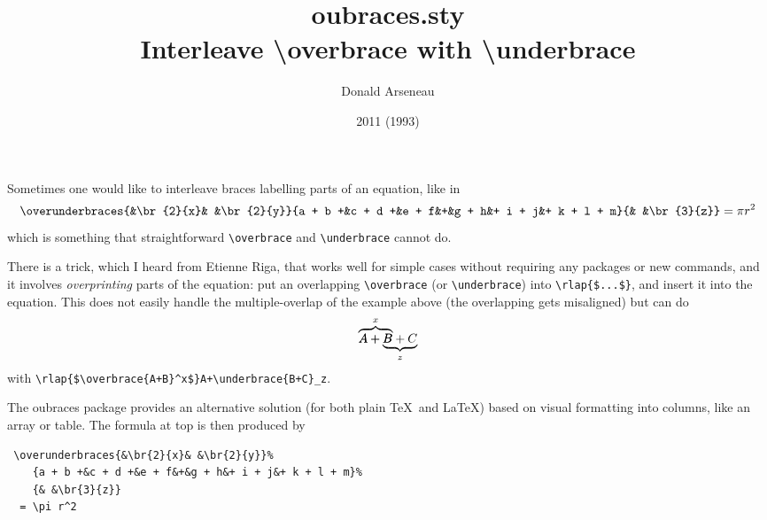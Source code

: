 \documentclass[11pt]{article}
\title{\textsf{oubraces.sty}\\[5pt]
    \large{Interleave \textbackslash overbrace with \textbackslash underbrace}}
\author{Donald Arseneau}
\date{2011 (1993)}
\begin{document}
\maketitle

\parskip=4pt
\linespread{1.05}\selectfont

\noindent Sometimes one would like to interleave braces labelling
parts of an equation, like in
$$
 \overunderbraces{&\br{2}{x}& &\br{2}{y}}%
    {a + b +&c + d +&e + f&+&g + h&+ i + j&+ k + l + m}%
    {&  &\br{3}{z}}
  = \pi r^2
$$
which is something that straightforward \verb"\overbrace" and 
\verb"\underbrace" cannot do. 

There is a trick, which I heard from Etienne Riga, that works well 
for simple cases without requiring any packages or new commands, and 
it involves \emph{overprinting} parts of the equation:
put an overlapping \verb"\overbrace" (or \verb"\underbrace") 
into \verb"\rlap{$...$}", and insert it into the equation.  
This does not easily handle the multiple-overlap of the example 
above (the overlapping gets misaligned) but can do 
$$
\rlap{$\overbrace{A+B}^x$}A+\underbrace{B+C}_z
$$
with \verb"\rlap{$\overbrace{A+B}^x$}A+\underbrace{B+C}_z".

The oubraces package provides an alternative solution (for both plain 
\TeX\ and \LaTeX) based on visual formatting into columns, like an array 
or table. The formula at top is then produced by
\begin{verbatim}
 \overunderbraces{&\br{2}{x}& &\br{2}{y}}%
    {a + b +&c + d +&e + f&+&g + h&+ i + j&+ k + l + m}%
    {& &\br{3}{z}}
  = \pi r^2
\end{verbatim}
\end{document}

